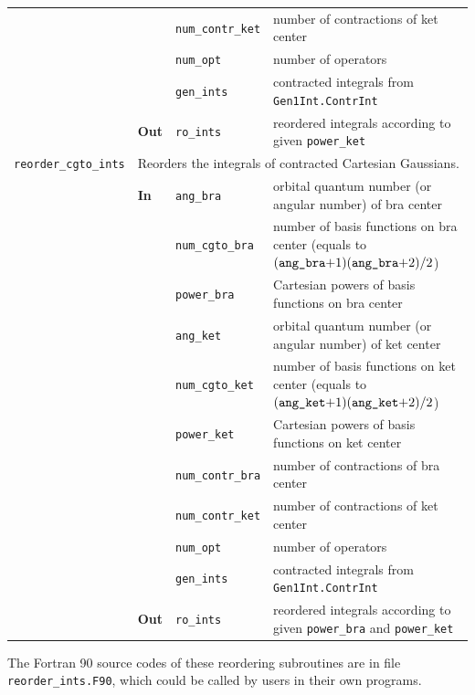 \documentclass[a4paper,11pt,twoside,openright]{book}
\begin{document}
\begin{center}
\begin{longtable}{l|p{0.8cm}|p{2.5cm}p{7.7cm}}
    \cline{3-4}
    & & \verb|num_contr_ket| & number of contractions of ket center\\
    \cline{3-4}
    & & \verb|num_opt| & number of operators\\
    \cline{3-4}
    & & \verb|gen_ints| & contracted integrals from \verb|Gen1Int.ContrInt|\\
    \cline{2-4}
    & \textbf{Out} & \verb|ro_ints| & reordered integrals according to given \verb|power_ket|\\
%
    \hline
    \verb|reorder_cgto_ints|\index{\textsl{public} \texttt{reorder\_cgto\_ints}} & %
      \multicolumn{3}{p{11cm}}{Reorders the integrals of contracted Cartesian Gaussians.}\\
    \cline{2-4}
    & \textbf{In} & \verb|ang_bra| & orbital quantum number (or angular number) of bra center\\
    \cline{3-4}
    & & \verb|num_cgto_bra| & number of basis functions on bra center (equals to %
      $(\verb|ang_bra|\mathrm{+}1)(\verb|ang_bra|\mathrm{+}2)/2$)\\
    \cline{3-4}
    & & \verb|power_bra| & Cartesian powers of basis functions on bra center\\
    \cline{3-4}
    & & \verb|ang_ket| & orbital quantum number (or angular number) of ket center\\
    \cline{3-4}
    & & \verb|num_cgto_ket| & number of basis functions on ket center (equals to %
      $(\verb|ang_ket|\mathrm{+}1)(\verb|ang_ket|\mathrm{+}2)/2$)\\
    \cline{3-4}
    & & \verb|power_ket| & Cartesian powers of basis functions on ket center\\
    \cline{3-4}
    & & \verb|num_contr_bra| & number of contractions of bra center\\
    \cline{3-4}
    & & \verb|num_contr_ket| & number of contractions of ket center\\
    \cline{3-4}
    & & \verb|num_opt| & number of operators\\
    \cline{3-4}
    & & \verb|gen_ints| & contracted integrals from \verb|Gen1Int.ContrInt|\\
    \cline{2-4}
    & \textbf{Out} & \verb|ro_ints| & reordered integrals according to given \verb|power_bra| and \verb|power_ket|\\
  \end{longtable}
\end{center}

The Fortran 90 source codes of these reordering subroutines are in file \verb|reorder_ints.F90|,
which could be called by users in their own programs.
\end{document}
